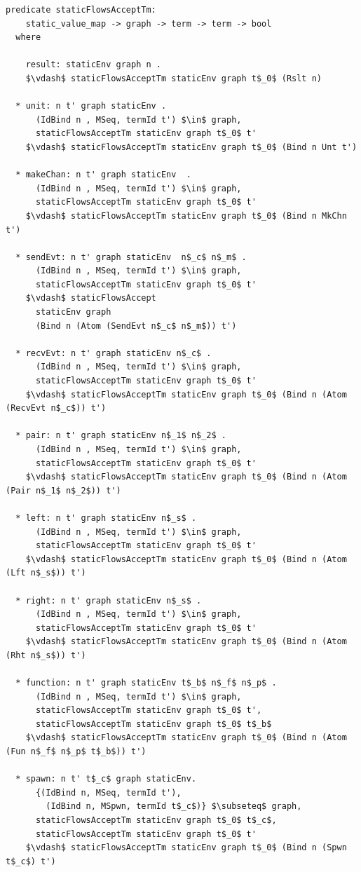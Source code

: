 \documentclass[letterpaper, 11pt]{extarticle}
\begin{document}
\begin{lstlisting}[language=logic, mathescape]
  predicate staticFlowsAcceptTm:
    static_value_map -> graph -> term -> term -> bool
  where

    result: staticEnv graph n .
    $\vdash$ staticFlowsAcceptTm staticEnv graph t$_0$ (Rslt n)

  * unit: n t' graph staticEnv .
      (IdBind n , MSeq, termId t') $\in$ graph,
      staticFlowsAcceptTm staticEnv graph t$_0$ t'
    $\vdash$ staticFlowsAcceptTm staticEnv graph t$_0$ (Bind n Unt t')

  * makeChan: n t' graph staticEnv  .
      (IdBind n , MSeq, termId t') $\in$ graph,
      staticFlowsAcceptTm staticEnv graph t$_0$ t'
    $\vdash$ staticFlowsAcceptTm staticEnv graph t$_0$ (Bind n MkChn t')

  * sendEvt: n t' graph staticEnv  n$_c$ n$_m$ .
      (IdBind n , MSeq, termId t') $\in$ graph,
      staticFlowsAcceptTm staticEnv graph t$_0$ t'
    $\vdash$ staticFlowsAccept
      staticEnv graph
      (Bind n (Atom (SendEvt n$_c$ n$_m$)) t')

  * recvEvt: n t' graph staticEnv n$_c$ .
      (IdBind n , MSeq, termId t') $\in$ graph,
      staticFlowsAcceptTm staticEnv graph t$_0$ t'
    $\vdash$ staticFlowsAcceptTm staticEnv graph t$_0$ (Bind n (Atom (RecvEvt n$_c$)) t')

  * pair: n t' graph staticEnv n$_1$ n$_2$ .
      (IdBind n , MSeq, termId t') $\in$ graph,
      staticFlowsAcceptTm staticEnv graph t$_0$ t'
    $\vdash$ staticFlowsAcceptTm staticEnv graph t$_0$ (Bind n (Atom (Pair n$_1$ n$_2$)) t')

  * left: n t' graph staticEnv n$_s$ .
      (IdBind n , MSeq, termId t') $\in$ graph,
      staticFlowsAcceptTm staticEnv graph t$_0$ t'
    $\vdash$ staticFlowsAcceptTm staticEnv graph t$_0$ (Bind n (Atom (Lft n$_s$)) t')

  * right: n t' graph staticEnv n$_s$ .
      (IdBind n , MSeq, termId t') $\in$ graph,
      staticFlowsAcceptTm staticEnv graph t$_0$ t'
    $\vdash$ staticFlowsAcceptTm staticEnv graph t$_0$ (Bind n (Atom (Rht n$_s$)) t')

  * function: n t' graph staticEnv t$_b$ n$_f$ n$_p$ .
      (IdBind n , MSeq, termId t') $\in$ graph,
      staticFlowsAcceptTm staticEnv graph t$_0$ t',
      staticFlowsAcceptTm staticEnv graph t$_0$ t$_b$
    $\vdash$ staticFlowsAcceptTm staticEnv graph t$_0$ (Bind n (Atom (Fun n$_f$ n$_p$ t$_b$)) t')

  * spawn: n t' t$_c$ graph staticEnv.
      {(IdBind n, MSeq, termId t'),
        (IdBind n, MSpwn, termId t$_c$)} $\subseteq$ graph,
      staticFlowsAcceptTm staticEnv graph t$_0$ t$_c$,
      staticFlowsAcceptTm staticEnv graph t$_0$ t'
    $\vdash$ staticFlowsAcceptTm staticEnv graph t$_0$ (Bind n (Spwn t$_c$) t')


\end{lstlisting}
\end{document}
